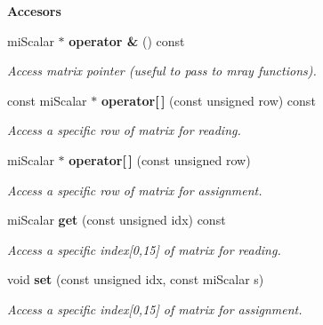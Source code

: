 \begin{Indent}{\bf Accesors}\par
\begin{CompactItemize}
\item 
mi\-Scalar $\ast$ {\bf operator \&} () const 
\begin{CompactList}\small\item\em Access matrix pointer (useful to pass to mray functions). \item\end{CompactList}\item 
const mi\-Scalar $\ast$ {\bf operator[$\,$]} (const unsigned row) const 
\begin{CompactList}\small\item\em Access a specific row of matrix for reading. \item\end{CompactList}\item 
mi\-Scalar $\ast$ {\bf operator[$\,$]} (const unsigned row)
\begin{CompactList}\small\item\em Access a specific row of matrix for assignment. \item\end{CompactList}\item 
mi\-Scalar {\bf get} (const unsigned idx) const 
\begin{CompactList}\small\item\em Access a specific index[0,15] of matrix for reading. \item\end{CompactList}\item 
void {\bf set} (const unsigned idx, const mi\-Scalar s)
\begin{CompactList}\small\item\em Access a specific index[0,15] of matrix for assignment. \item\end{CompactList}\end{CompactItemize}
\end{Indent}
